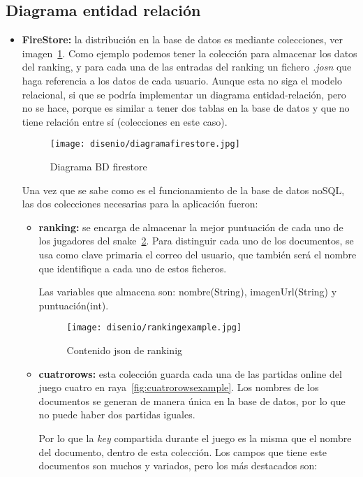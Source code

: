 \subsection{Diagrama entidad relación}
\begin{itemize}
	\item \textbf{FireStore:} la distribución en la base de datos es mediante colecciones, ver imagen~\ref{fig:diagramfirestore}. Como ejemplo podemos tener la colección para almacenar los datos del ranking, y para cada una de las entradas del ranking un fichero \emph{.josn} que haga referencia a los datos de cada usuario. Aunque esta no siga el modelo relacional, si que se podría implementar un diagrama entidad-relación, pero no se hace, porque es similar a tener dos tablas en la base de datos y que no tiene relación entre sí  (colecciones en este caso).
	
	\begin{figure}[H]
		\centering
		\texttt{[image: disenio/diagramafirestore.jpg]}
		\caption{Diagrama BD firestore}\label{fig:diagramfirestore}
	\end{figure}

	Una vez que se sabe como es el funcionamiento de la base de datos noSQL, las dos colecciones necesarias para la aplicación fueron:
	
	\begin{itemize}
		\item \textbf{ranking:} se encarga de almacenar la mejor puntuación de cada uno de los jugadores del snake~\ref{fig:rankingexample}. Para distinguir cada uno de los documentos, se usa como clave primaria el correo del usuario, que también será el nombre que identifique a cada uno de estos ficheros.
		
		Las variables que almacena son: nombre(String), imagenUrl(String) y puntuación(int). 
		
		\begin{figure}[H]
			\centering
			\texttt{[image: disenio/rankingexample.jpg]}
			\caption{Contenido json de rankinig}\label{fig:rankingexample}
		\end{figure}
	
		\item \textbf{cuatrorows:} esta colección guarda cada una de las partidas online del juego cuatro en raya~\ref{fig:cuatrorowsexample}. Los nombres de los documentos se generan de manera única en la base de datos, por lo que no puede haber dos partidas iguales.
		
		Por lo que la \emph{key} compartida durante el juego es la misma que el nombre del documento, dentro de esta colección. Los campos que tiene este documentos son muchos y variados, pero los más destacados son: 
		

\end{itemize}
\end{itemize}
